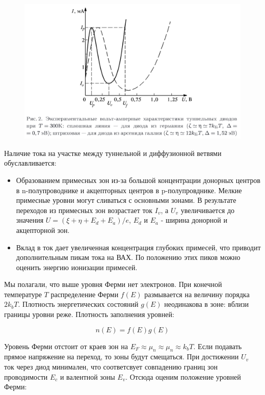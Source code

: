 \documentclass[a4paper]{article}
\begin{document}
\begin{figure}[h]
    \begin{center}
        \includegraphics[scale = 0.6]{p2.png}
        \caption{}
        \label{p2}
    \end{center}
\end{figure}

Наличие тока на участке между туннельной и диффузионной ветвями обуславливается: 
\begin{itemize}
    \item Образованием примесных зон из-за большой концентрации донорных центров в 
    n-полупроводнике и акцепторных центров в p-полупровднике. Мелкие примесные уровни могут сливаться с основными зонами. 
    В результате переходов из примесных зон возрастает ток $I_v$, а $U_v$ увеличивается до значения $U = (\xi + \eta + E_d + E_a)/e$, $E_d$ и $E_a$ - ширина донорной и акцепторной зон. 
    \item Вклад в ток дает увеличенная концентрация глубоких примесей, что приводит дополнительным пикам тока на ВАХ. По положению этих пиков можно оценить энергию ионизации примесей. 
\end{itemize}

Мы полагали, что выше уровня Ферми нет электронов. При конечной температуре $T$ распределение Ферми $f(E)$ размывается на величину порядка $2k_bT$. Плотность энергетических состояний $g(E)$ неодинакова в зоне: вблизи 
границы уровни реже. Плотность заполнения уровней:

\begin{equation}
    n(E) = f(E)g(E)
\end{equation}

Уровень Ферми отстоит от краев зон на $E_F \approx \mu_n \approx \mu_n \approx k_bT$. Если подавать прямое напряжение на переход, то зоны будут смещаться. При достижении $U_v$ ток через диод минимален, что соответсвует совпадению 
границ зон проводимости $E_c$ и валентной зоны $E_v$. Отсюда оценим положение уровней Ферми:
\end{document}
